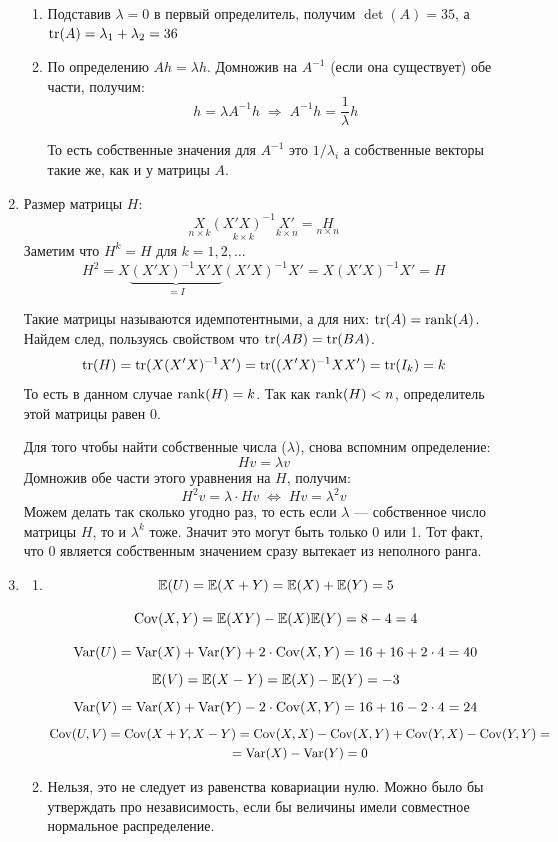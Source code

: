 \documentclass[12pt, a4paper]{article}
\begin{document}
\begin{enumerate}
\begin{enumerate}
  \item Подставив $\lambda = 0$ в первый определитель, получим $\det(A)=35$, а $\operatorname{tr}(A) = \lambda_1 + \lambda_2 = 36$

  \item По определению $Ah = \lambda h$. Домножив на $A^{-1}$ (если она существует) обе части, получим:
  \[
  h = \lambda A^{-1} h \; \Rightarrow \; A^{-1}h = \frac{1}{\lambda}h
  \]



  То есть собственные значения для $A^{-1}$ это $1/\lambda_i$ а собственные векторы такие же, как и у матрицы $A$.
  \end{enumerate}



\item
  Размер матрицы $H$:
  \[
  \underset{n\times k}{X} \underset{k\times k}{(X'X)^{-1}} \underset{k\times n}{X'} = \underset{n\times n}{H}
  \]
  Заметим что $H^k = H$ для $k = 1,2,\ldots$
  \[
  H^2 = X\underbrace{(X'X)^{-1}X'X}_{{}=I}(X'X)^{-1}X' = X(X'X)^{-1}X' = H
  \]

  Такие матрицы называются идемпотентными, а для них: $\operatorname{tr}(A) = \operatorname{rank}(A)$. Найдем след, пользуясь свойством что $\operatorname{tr}(AB) = \operatorname{tr}(BA)$.
  \[
  \operatorname{tr}(H) = \operatorname{tr}(X(X'X)^{-1}X') = \operatorname{tr}((X'X)^{-1}XX') = \operatorname{tr}(I_k) = k
  \]
  То есть в данном случае $\operatorname{rank}(H) = k$. Так как $\operatorname{rank}(H) < n$, определитель этой матрицы равен 0.

  Для того чтобы найти собственные числа ($\lambda$), снова вспомним определение:
  \[
  Hv = \lambda v
  \]
  Домножив обе части этого уравнения на $H$, получим:
  \[
  H^2v = \lambda\cdot Hv \; \Leftrightarrow \; Hv = \lambda^2v
  \]
  Можем делать так сколько угодно раз, то есть если $\lambda$ — собственное число матрицы $H$, то и $\lambda^k$ тоже. Значит это могут быть только 0 или 1. Тот факт, что 0 является собственным значением сразу вытекает из неполного ранга.



\item
  \begin{enumerate}
  \item
  \[
  \mathbb{E}(U) = \mathbb{E}(X+Y) = \mathbb{E}(X) + \mathbb{E}(Y) = 5
  \]

  \[
  \operatorname{Cov}(X,Y) = \mathbb{E}(XY) - \mathbb{E}(X)\mathbb{E}(Y) = 8 - 4 = 4
  \]

  \[
  \operatorname{Var}(U) = \operatorname{Var}(X) + \operatorname{Var}(Y) + 2\cdot \operatorname{Cov}(X, Y)= 16 + 16 + 2\cdot 4 = 40
  \]
  \[
  \mathbb{E}(V) = \mathbb{E}(X-Y) = \mathbb{E}(X) - \mathbb{E}(Y) = -3
  \]
  \[
  \operatorname{Var}(V) = \operatorname{Var}(X) + \operatorname{Var}(Y) - 2\cdot \operatorname{Cov}(X, Y)= 16 + 16 - 2\cdot 4 = 24
  \]
  \begin{multline}
  \operatorname{Cov}(U, V) = \operatorname{Cov}(X + Y, X-Y) = \operatorname{Cov}(X,X) - \operatorname{Cov}(X,Y) + \operatorname{Cov}(Y,X) - \operatorname{Cov}(Y,Y)= \\
   = \operatorname{Var}(X)-\operatorname{Var}(Y) = 0
  \end{multline}
  \item Нельзя, это не следует из равенства ковариации нулю. Можно было бы утверждать про независимость, если бы величины имели совместное нормальное распределение.


\end{enumerate}
\end{enumerate}
\end{document}
